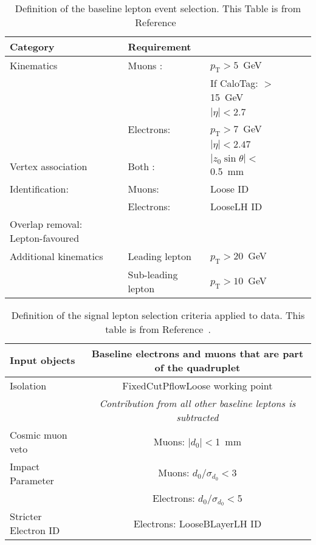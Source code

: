 \begin{table}[ht]
    \centering
        \begin{tabular}{lllll}
            Category & Requirement \\
            \hline
            \hline
            Kinematics & Muons : & $p_\text{T} > 5$~GeV{} \\
                       &         &  If CaloTag: $> $15~GeV \\
                       &         &   $|\eta| < 2.7$  \\[0.2cm]
                       & Electrons: & $p_\text{T} > 7$~GeV \\
                       &            & $|\eta| < 2.47$  \\ 
            \hline
            Vertex association 
                       & Both : & $|z_{0} \sin{\theta}| <$0.5~mm \\
            \hline Identification: 
                       & Muons: & Loose ID  \\ 
                       & Electrons: & LooseLH ID  \\
            \hline
            Overlap removal: Lepton-favoured \\ 
            \hline
            Additional kinematics & Leading lepton & $p_\text{T} > 20$~GeV{}\\
                & Sub-leading lepton & $p_\text{T} > 10$~GeV{}\\
        \end{tabular}
    \caption{Definition of the baseline lepton event selection. This Table is from Reference~\cite{m4l_internalnote} \label{tab:baselineLeptons}}
\end{table}  
          
\begin{table}[ht]
    \centering
        \begin{tabular}{l  c }
            Input objects &  Baseline electrons and muons that are part of the quadruplet \\ 
            \hline
            Isolation  &   FixedCutPflowLoose working point\\ %
                       &   \textit{Contribution from all other baseline leptons is subtracted} \\
            \hline    
            Cosmic muon veto & Muons: $|d_{0}| < $1~mm\\
            \hline
            Impact Parameter &  Muons: $d_{0}/\sigma_{d_{0}} < $3 \\
                             &  Electrons: $d_{0}/\sigma_{d_{0}} < $5 \\
            \hline
            Stricter Electron ID &  Electrons: LooseBLayerLH ID \\
        \end{tabular}
        \caption{Definition of the signal lepton selection criteria applied to data. This table is from Reference~\cite{m4l_internalnote}.\label{tab:signalLeptons}}
\end{table}
